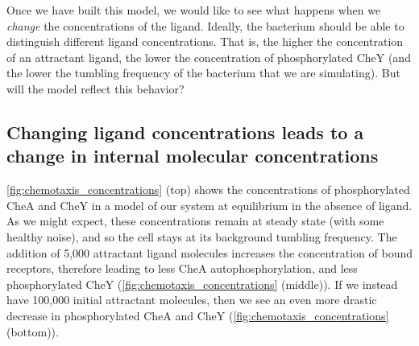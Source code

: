 Once we have built this model, we would like to see what happens when we \textit{change} the concentrations of the ligand. Ideally, the bacterium should be able to distinguish different ligand concentrations. That is, the higher the concentration of an attractant ligand, the lower the concentration of phosphorylated CheY (and the lower the tumbling frequency of the bacterium that we are simulating). But will the model reflect this behavior?

\FloatBarrier
{}
\subsection{Changing ligand concentrations leads to a change in internal molecular concentrations}

\autoref{fig:chemotaxis_concentrations} (top) shows the concentrations of phosphorylated CheA and CheY in a model of our system at equilibrium in the absence of ligand. As we might expect, these concentrations remain at steady state (with some healthy noise), and so the cell stays at its background tumbling frequency. The addition of 5,000 attractant ligand molecules increases the concentration of bound receptors, therefore leading to less CheA autophosphorylation, and less phosphorylated CheY (\autoref{fig:chemotaxis_concentrations} (middle)). If we instead have 100,000 initial attractant molecules, then we see an even more drastic decrease in phosphorylated CheA and CheY (\autoref{fig:chemotaxis_concentrations} (bottom)).

